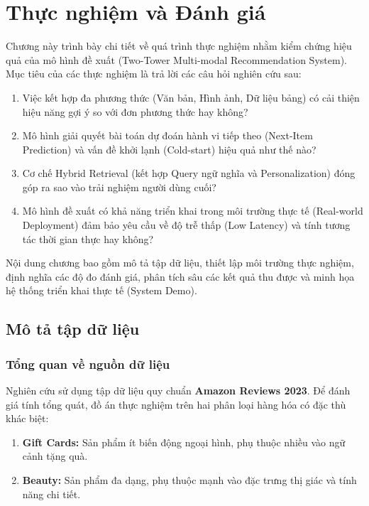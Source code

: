 
\chapter{Thực nghiệm và Đánh giá}
\label{chap:experiment}

Chương này trình bày chi tiết về quá trình thực nghiệm nhằm kiểm chứng hiệu quả của mô hình đề xuất (Two-Tower Multi-modal Recommendation System). Mục tiêu của các thực nghiệm là trả lời các câu hỏi nghiên cứu sau:

\begin{enumerate}
    \item Việc kết hợp đa phương thức (Văn bản, Hình ảnh, Dữ liệu bảng) có cải thiện hiệu năng gợi ý so với đơn phương thức hay không?
    \item Mô hình giải quyết bài toán dự đoán hành vi tiếp theo (Next-Item Prediction) và vấn đề khởi lạnh (Cold-start) hiệu quả như thế nào?
    \item Cơ chế Hybrid Retrieval (kết hợp Query ngữ nghĩa và Personalization) đóng góp ra sao vào trải nghiệm người dùng cuối?
    \item Mô hình đề xuất có khả năng triển khai trong môi trường thực tế (Real-world Deployment) đảm bảo yêu cầu về độ trễ thấp (Low Latency) và tính tương tác thời gian thực hay không?
\end{enumerate}

Nội dung chương bao gồm mô tả tập dữ liệu, thiết lập môi trường thực nghiệm, định nghĩa các độ đo đánh giá, phân tích sâu các kết quả thu được và minh họa hệ thống triển khai thực tế (System Demo).

\section{Mô tả tập dữ liệu}
\label{sec:data_desc}

\subsection{Tổng quan về nguồn dữ liệu}
Nghiên cứu sử dụng tập dữ liệu quy chuẩn \textbf{Amazon Reviews 2023}. Để đánh giá tính tổng quát, đồ án thực nghiệm trên hai phân loại hàng hóa có đặc thù khác biệt:
\begin{enumerate}
    \item \textbf{Gift Cards:} Sản phẩm ít biến động ngoại hình, phụ thuộc nhiều vào ngữ cảnh tặng quà.
    \item \textbf{Beauty:} Sản phẩm đa dạng, phụ thuộc mạnh vào đặc trưng thị giác và tính năng chi tiết.
\end{enumerate}

